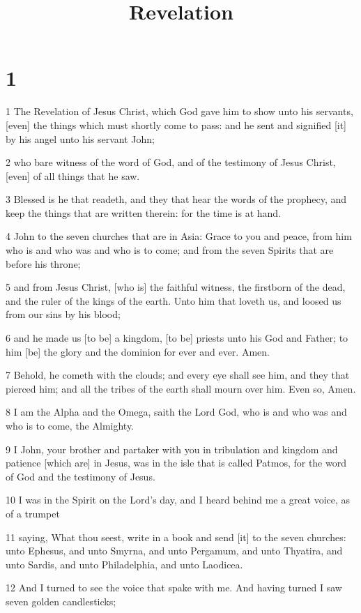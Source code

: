 

\title{Revelation}

\chapter{1}

\par 1 The Revelation of Jesus Christ, which God gave him to show unto his servants, [even] the things which must shortly come to pass: and he sent and signified [it] by his angel unto his servant John;
\par 2 who bare witness of the word of God, and of the testimony of Jesus Christ, [even] of all things that he saw.
\par 3 Blessed is he that readeth, and they that hear the words of the prophecy, and keep the things that are written therein: for the time is at hand.
\par 4 John to the seven churches that are in Asia: Grace to you and peace, from him who is and who was and who is to come; and from the seven Spirits that are before his throne;
\par 5 and from Jesus Christ, [who is] the faithful witness, the firstborn of the dead, and the ruler of the kings of the earth. Unto him that loveth us, and loosed us from our sins by his blood;
\par 6 and he made us [to be] a kingdom, [to be] priests unto his God and Father; to him [be] the glory and the dominion for ever and ever. Amen.
\par 7 Behold, he cometh with the clouds; and every eye shall see him, and they that pierced him; and all the tribes of the earth shall mourn over him. Even so, Amen.
\par 8 I am the Alpha and the Omega, saith the Lord God, who is and who was and who is to come, the Almighty.
\par 9 I John, your brother and partaker with you in tribulation and kingdom and patience [which are] in Jesus, was in the isle that is called Patmos, for the word of God and the testimony of Jesus.
\par 10 I was in the Spirit on the Lord's day, and I heard behind me a great voice, as of a trumpet
\par 11 saying, What thou seest, write in a book and send [it] to the seven churches: unto Ephesus, and unto Smyrna, and unto Pergamum, and unto Thyatira, and unto Sardis, and unto Philadelphia, and unto Laodicea.
\par 12 And I turned to see the voice that spake with me. And having turned I saw seven golden candlesticks;
